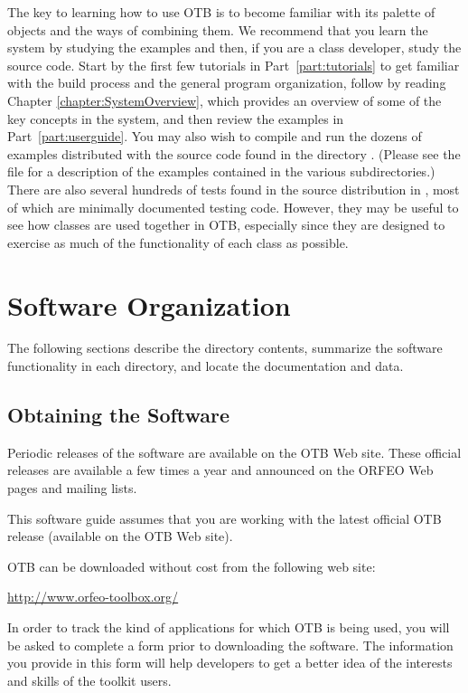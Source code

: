 The key to learning how to use OTB is to become familiar with its
palette of objects and the ways of combining them. We recommend that you learn
the system by studying the
examples and then, if you are a class developer, study the source
code. Start by the first few tutorials in Part~\ref{part:tutorials} to get
familiar with the build process and the general program organization, follow by
reading Chapter \ref{chapter:SystemOverview}, which provides an overview of some
of the key concepts in the system, and then review the examples in
Part~\ref{part:userguide}. You may also wish to compile and run the dozens of
examples
distributed with the source code found in the directory
. (Please see the file
 for a description of the examples
contained in the various subdirectories.) There are also several
hundreds of tests found in the source distribution in
, most of which are minimally documented
testing code. However, they may be useful to see how classes are used
together in OTB, especially since they are designed to exercise as
much of the functionality of each class as possible.

\section{Software Organization}
\label{sec:SoftwareOrganization}

The following sections describe the directory contents, summarize the
software functionality in each directory, and locate the documentation and
data.

\subsection{Obtaining the Software}
\label{sec:ObtainingTheSoftware}

Periodic releases of the software are available on the OTB Web
site. These official releases are available a few times a year and
announced on the ORFEO Web pages and mailing lists.

This software guide assumes that you are working with the latest official OTB
release (available on the OTB Web site). %


OTB can be downloaded without cost from the following web site:
\begin{center}
  \url{http://www.orfeo-toolbox.org/}
\end{center}
In order to track the kind of applications for which OTB is being used, you
will be asked to complete a form prior to downloading the software.
The information you provide in this form will help developers to get a better
idea of the interests and skills of the toolkit users.

